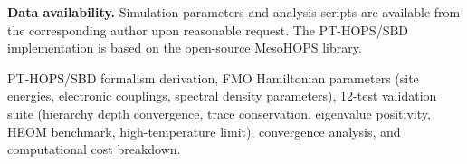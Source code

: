 \documentclass[journal=jpcl,manuscript=letter]{achemso}
\begin{document}
\textbf{Data availability.} Simulation parameters and analysis scripts are available from the corresponding author upon reasonable request. The PT-HOPS/SBD implementation is based on the open-source MesoHOPS library.


\begin{suppinfo}
PT-HOPS/SBD formalism derivation, FMO Hamiltonian parameters (site energies, electronic couplings, spectral density parameters), 12-test validation suite (hierarchy depth convergence, trace conservation, eigenvalue positivity, HEOM benchmark, high-temperature limit), convergence analysis, and computational cost breakdown.
\end{suppinfo}



\end{document}
